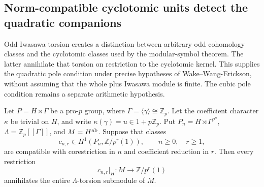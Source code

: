 \subsection{Norm-compatible cyclotomic units detect the quadratic companions}
\label{sec:universal-cyclotomic-pair}

Odd Iwasawa torsion creates a distinction between arbitrary odd
cohomology classes and the cyclotomic classes used by the modular-symbol
theorem.  The latter annihilate that torsion on restriction to the
cyclotomic kernel.  This supplies the quadratic pole condition under
precise hypotheses of Wake--Wang-Erickson, without assuming that the
whole plus Iwasawa module is finite.  The cubic pole condition remains
a separate arithmetic hypothesis.

\begin{lemma}\label{lem:norm-torsion}
Let \(P=H\rtimes\Gamma\) be a pro-\(p\) group, where
\(\Gamma=\langle\gamma\rangle\cong\mathbb Z_p\).  Let the coefficient
character \(\kappa\) be trivial on \(H\), and write
\(\kappa(\gamma)=u\in1+p\mathbb Z_p\).
Put \(P_n=H\rtimes\Gamma^{p^n}\),
\(\Lambda=\mathbb Z_p[[\Gamma]]\), and \(M=H^{\rm ab}\).
Suppose that classes
\[
 c_{n,r}\in H^1(P_n,\mathbb Z/p^r(1)),
 \qquad n\geq0,\quad r\geq1,
\]
are compatible with corestriction in \(n\) and coefficient reduction
in \(r\).  Then every restriction
\[
 c_{n,r}|_H:M\longrightarrow\mathbb Z/p^r(1)
\]
annihilates the entire \(\Lambda\)-torsion submodule of \(M\).
\end{lemma}


